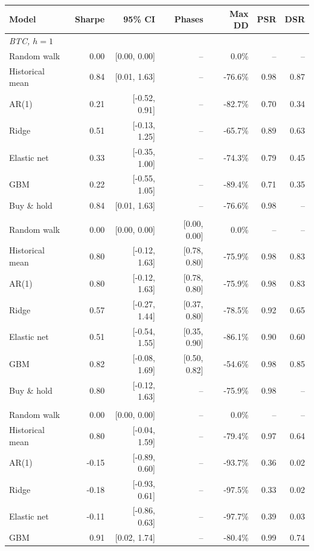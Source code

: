 \begin{tabular}{lrrrrrr}
\toprule
Model & Sharpe & 95\% CI & Phases & Max DD & PSR & DSR \\
\midrule
\multicolumn{7}{l}{\emph{BTC, $h=1$}} \\
\quad Random walk & 0.00 & [0.00, 0.00] & -- & 0.0\% & -- & -- \\
\quad Historical mean & 0.84 & [0.01, 1.63] & -- & -76.6\% & 0.98 & 0.87 \\
\quad AR(1) & 0.21 & [-0.52, 0.91] & -- & -82.7\% & 0.70 & 0.34 \\
\quad Ridge & 0.51 & [-0.13, 1.25] & -- & -65.7\% & 0.89 & 0.63 \\
\quad Elastic net & 0.33 & [-0.35, 1.00] & -- & -74.3\% & 0.79 & 0.45 \\
\quad GBM & 0.22 & [-0.55, 1.05] & -- & -89.4\% & 0.71 & 0.35 \\
\quad Buy \& hold & 0.84 & [0.01, 1.63] & -- & -76.6\% & 0.98 & -- \\
\addlinespace
\multicolumn{7}{l}{\emph{BTC, $h=7$}} \\
\quad Random walk & 0.00 & [0.00, 0.00] & [0.00, 0.00] & 0.0\% & -- & -- \\
\quad Historical mean & 0.80 & [-0.12, 1.63] & [0.78, 0.80] & -75.9\% & 0.98 & 0.83 \\
\quad AR(1) & 0.80 & [-0.12, 1.63] & [0.78, 0.80] & -75.9\% & 0.98 & 0.83 \\
\quad Ridge & 0.57 & [-0.27, 1.44] & [0.37, 0.80] & -78.5\% & 0.92 & 0.65 \\
\quad Elastic net & 0.51 & [-0.54, 1.55] & [0.35, 0.90] & -86.1\% & 0.90 & 0.60 \\
\quad GBM & 0.82 & [-0.08, 1.69] & [0.50, 0.82] & -54.6\% & 0.98 & 0.85 \\
\quad Buy \& hold & 0.80 & [-0.12, 1.63] & -- & -75.9\% & 0.98 & -- \\
\addlinespace
\multicolumn{7}{l}{\emph{ETH, $h=1$}} \\
\quad Random walk & 0.00 & [0.00, 0.00] & -- & 0.0\% & -- & -- \\
\quad Historical mean & 0.80 & [-0.04, 1.59] & -- & -79.4\% & 0.97 & 0.64 \\
\quad AR(1) & -0.15 & [-0.89, 0.60] & -- & -93.7\% & 0.36 & 0.02 \\
\quad Ridge & -0.18 & [-0.93, 0.61] & -- & -97.5\% & 0.33 & 0.02 \\
\quad Elastic net & -0.11 & [-0.86, 0.63] & -- & -97.7\% & 0.39 & 0.03 \\
\quad GBM & 0.91 & [0.02, 1.74] & -- & -80.4\% & 0.99 & 0.74 \\

\end{tabular}
